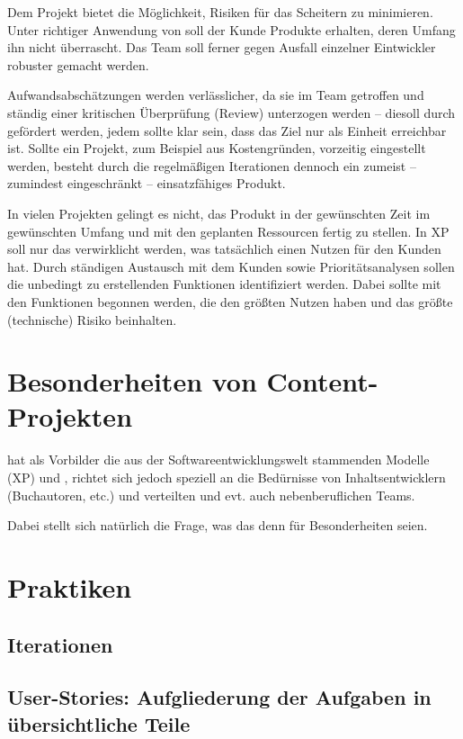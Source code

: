 \documentclass[fontsize=9pt,paper=a4,parskip=half,DIV=11,twocolumn]{scrartcl}
\begin{document}
Dem Projekt bietet \ADCD{} die Möglichkeit, Risiken für das Scheitern zu
minimieren. Unter richtiger Anwendung von \ADCD{} soll der Kunde Produkte
erhalten, deren Umfang ihn nicht überrascht. Das Team soll ferner gegen Ausfall einzelner Eintwickler robuster
gemacht werden. 

Aufwandsabschätzungen werden verlässlicher, da sie im Team getroffen und ständig
einer kritischen Überprüfung (Review) unterzogen werden -- diesoll durch
\ADCD{} gefördert werden, jedem sollte klar sein, dass das Ziel
nur als Einheit erreichbar ist. Sollte ein Projekt, zum Beispiel aus
Kostengründen, vorzeitig eingestellt werden, besteht durch die regelmäßigen
Iterationen dennoch ein zumeist -- zumindest eingeschränkt -- einsatzfähiges
Produkt.

In vielen Projekten gelingt es nicht, das Produkt in der gewünschten Zeit im
gewünschten Umfang und mit den geplanten Ressourcen fertig zu stellen. In XP soll
nur das verwirklicht werden, was tatsächlich einen Nutzen für den Kunden hat.
Durch ständigen Austausch mit dem Kunden sowie Prioritätsanalysen sollen die
unbedingt zu erstellenden Funktionen identifiziert werden. Dabei sollte mit den
Funktionen begonnen werden, die den größten Nutzen haben und das größte
(technische) Risiko beinhalten.



\section{Besonderheiten von Content-Projekten}

\ADCD{} hat als Vorbilder die aus der Softwareentwicklungswelt stammenden
Modelle  (XP) und , richtet sich jedoch
speziell an die Bedürnisse von Inhaltsentwicklern (Buchautoren, etc.) und verteilten und evt.
auch nebenberuflichen Teams. 

Dabei stellt sich natürlich die Frage, was das denn für Besonderheiten seien.


\section{Praktiken}

\subsection{Iterationen}

\subsection{User-Stories: Aufgliederung der Aufgaben in übersichtliche Teile}
\end{document}
